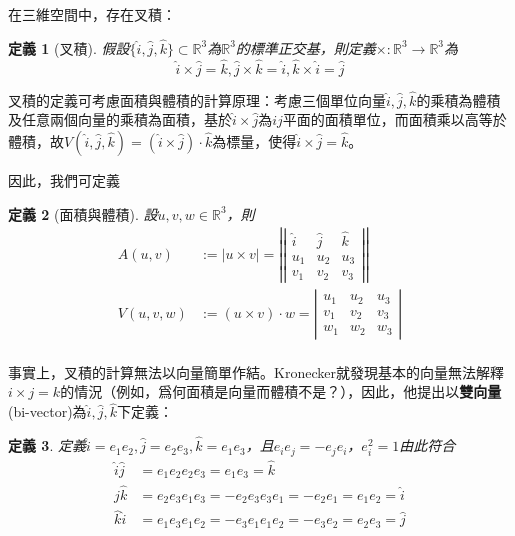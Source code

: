 \documentclass[12pt]{article}
\newtheorem{definition}{定義}
\begin{document}
    在三維空間中，存在叉積：

    \begin{definition}[叉積]
        假設$\{\hat{i},\hat{j},\hat{k}\}\subset \mathbb{R}^3$為$\mathbb{R}^3$的標準正交基，則定義$\times:\mathbb{R}^3\to\mathbb{R}^3$為$$\hat{i}\times \hat{j}=\hat{k},\hat{j}\times \hat{k}=\hat{i}, \hat{k}\times \hat{i}=\hat{j}$$
    \end{definition}

    叉積的定義可考慮面積與體積的計算原理：考慮三個單位向量$\hat{i},\hat{j},\hat{k}$的乘積為體積及任意兩個向量的乘積為面積，基於$\hat{i}\times \hat{j}$為$ij$平面的面積單位，而面積乘以高等於體積，故$V(\hat{i},\hat{j},\hat{k})=(\hat{i}\times \hat{j})\cdot \hat{k}$為標量，使得$\hat{i}\times\hat{j}=\hat{k}$。

    因此，我們可定義

    \begin{definition}[面積與體積]
        設$u,v,w\in\mathbb{R}^3$，則\begin{align*}
            A(u,v)&:=|u\times v|=\left|\left|\begin{matrix}
                \hat{i}&\hat{j}&\hat{k}\\
                u_1&u_2&u_3\\
                v_1&v_2&v_3
            \end{matrix}\right|\right|\\
            V(u,v,w)&:=(u\times v)\cdot w=\left|\begin{matrix}
                u_1&u_2&u_3\\
                v_1&v_2&v_3\\
                w_1&w_2&w_3
            \end{matrix}\right|\\
        \end{align*}
    \end{definition}

    事實上，叉積的計算無法以向量簡單作結。Kronecker就發現基本的向量無法解釋$i\times j=k$的情況（例如，爲何面積是向量而體積不是？），因此，他提出以\textbf{雙向量}(bi-vector)為$\hat{i},\hat{j},\hat{k}$下定義：

    \begin{definition}
        定義$\hat{i}=e_1e_2,\hat{j}=e_2e_3,\hat{k}=e_1e_3$，且$e_ie_j=-e_je_i$，$e_i^2=1$由此符合\begin{align*}
            \hat{i}\hat{j}&=e_1e_2e_2e_3=e_1e_3=\hat{k}\\
            \hat{j}\hat{k}&=e_2e_3e_1e_3=-e_2e_3e_3e_1=-e_2e_1=e_1e_2=\hat{i}\\
            \hat{k}\hat{i}&=e_1e_3e_1e_2=-e_3e_1e_1e_2=-e_3e_2=e_2e_3=\hat{j}
        \end{align*}
    \end{definition}
\end{document}
